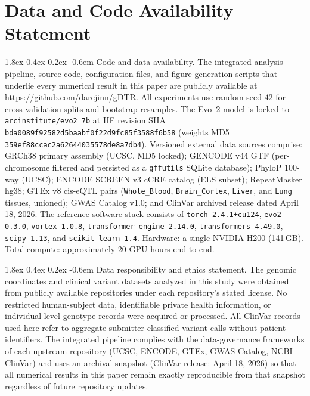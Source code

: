 \documentclass{article}
\makeatletter
\renewcommand\paragraph{\@startsection{paragraph}{4}{\z@}%
  {1.8ex \@plus 0.4ex \@minus 0.2ex}%
  {-0.6em}%
{\normalfont\normalsize\bfseries}}
\theoremstyle{plain}
\theoremstyle{definition}
\theoremstyle{remark}
\makeatother
\begin{document}
\section{Data and Code Availability Statement}
\label{app:repro}

\paragraph{Code and data availability.}
The integrated analysis pipeline, source code, configuration files, and figure-generation scripts that underlie every numerical result in this paper are publicly available at \url{https://github.com/darejinn/gDTR}. All experiments use random seed $42$ for cross-validation splits and bootstrap resamples. The Evo~2 model is locked to \texttt{arcinstitute/evo2\_7b} at HF revision SHA \texttt{bda0089f92582d5baabf0f22d9fc85f3588f6b58} (weights MD5 \texttt{359ef88ccac2a62644035578de8a7db4}). Versioned external data sources comprise: GRCh38 primary assembly (UCSC, MD5 locked); GENCODE v44 GTF (per-chromosome filtered and persisted as a \texttt{gffutils} SQLite database); PhyloP 100-way (UCSC); ENCODE SCREEN v3 cCRE catalog (ELS subset); RepeatMasker hg38; GTEx v8 cis-eQTL pairs (\texttt{Whole\_Blood}, \texttt{Brain\_Cortex}, \texttt{Liver}, and \texttt{Lung} tissues, unioned); GWAS Catalog v1.0; and ClinVar archived release dated April 18, 2026. The reference software stack consists of \texttt{torch 2.4.1+cu124}, \texttt{evo2 0.3.0}, \texttt{vortex 1.0.8}, \texttt{transformer-engine 2.14.0}, \texttt{transformers 4.49.0}, \texttt{scipy 1.13}, and \texttt{scikit-learn 1.4}. Hardware: a single NVIDIA H200 (141\,GB). Total compute: approximately 20 GPU-hours end-to-end.

\paragraph{Data responsibility and ethics statement.}
The genomic coordinates and clinical variant datasets analyzed in this study were obtained from publicly available repositories under each repository's stated license. No restricted human-subject data, identifiable private health information, or individual-level genotype records were acquired or processed. All ClinVar records used here refer to aggregate submitter-classified variant calls without patient identifiers. The integrated pipeline complies with the data-governance frameworks of each upstream repository (UCSC, ENCODE, GTEx, GWAS Catalog, NCBI ClinVar) and uses an archival snapshot (ClinVar release: April 18, 2026) so that all numerical results in this paper remain exactly reproducible from that snapshot regardless of future repository updates.
\end{document}
